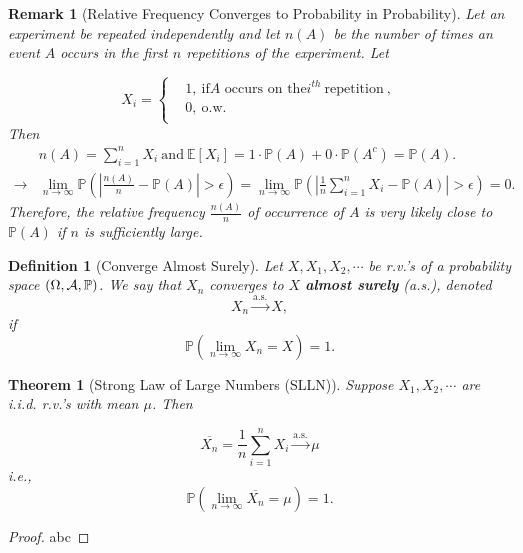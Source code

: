 \documentclass[openany,12pt]{book}
\newtheorem{theorem}{Theorem}[chapter]
\newtheorem{remark}{Remark}[chapter]
\newtheorem{definition}{Definition}[chapter]
\begin{document}
\begin{remark}[Relative Frequency Converges to Probability in Probability]
  Let an experiment be repeated independently and let $n(A)$ be the
  number of times an event $A$ occurs in the first $n$ repetitions of
  the experiment. Let

  \[X_{i} = \left\{ \begin{aligned}
       & 1,~\text{if} A \text{ occurs on the} i^{th} ~\text{repetition}~, \\
       & 0,~\text{o.w.}~                                                  \\
    \end{aligned} \right.\]
  Then
  \[\begin{aligned}
          & n(A)= \sum_{i = 1}^{n}X_{i}~\text{and}~\mathbb{E}[X_{i}]= 1 \cdot \mathbb{P}(A) + 0 \cdot \mathbb{P}(A^{c})= \mathbb{P}(A).                                                                                                          \\
      \to & \lim_{n \to \infty}{\mathbb{P}\left( \left| \frac{n(A)}{n} - \mathbb{P}(A) \right| > \epsilon \right)} = \lim_{n \to \infty}{\mathbb{P}\left( \left| \frac{1}{n}\sum_{i = 1}^{n}X_{i} - \mathbb{P}(A) \right| > \epsilon \right)} = 0.
    \end{aligned}\]
  Therefore, the relative frequency $\frac{n(A)}{n}$ of occurrence of $A$ is very likely close to $\mathbb{P}(A)$ if $n$ is sufficiently large.
\end{remark}

\begin{definition}[Converge Almost Surely]
  Let $X,X_{1}, X_{2},\cdots$ be r.v.'s of a probability space $(\Omega,\mathcal{A},\mathbb{P})$. We say that $X_{n}$ converges to $X$ \textbf{almost surely} (a.s.),
  denoted
  \[X_{n}\xrightarrow{ \text{a.s.} }X,\]
  if \[\mathbb{P}\left( \lim_{n \to \infty}X_{n} = X \right)= 1.\]
\end{definition}

\begin{theorem}[Strong Law of Large Numbers (SLLN)]
  Suppose $X_{1}, X_{2}, \cdots$ are i.i.d. r.v.'s with mean $\mu$. Then

  \[\overline{X_{n}} = \frac{1}{n}\sum_{i = 1}^{n}X_{i}\xrightarrow{ \text{a.s.} }\mu\]
  i.e.,
  \[\mathbb{P}\left( \lim_{n \to \infty}\overline{X_{n}} = \mu \right)= 1.\]
\end{theorem}

\begin{proof}
  abc
\end{proof}
\end{document}
